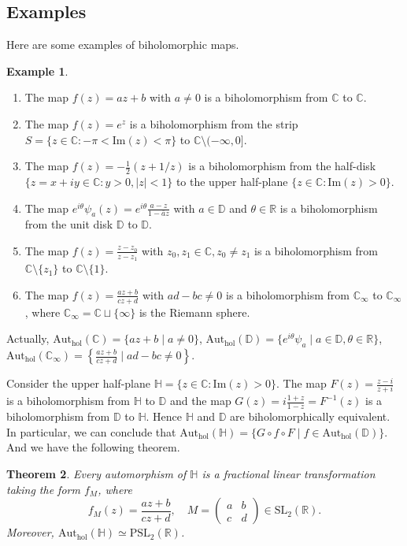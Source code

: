 \documentclass{article}
\newtheorem{theorem}{Theorem}[section]
\theoremstyle{definition}
\newtheorem{example}[theorem]{Example}
\newcommand{\R}{\mathbb{R}}
\newcommand{\C}{\mathbb{C}}
\newcommand{\im}{\mathrm{Im}}
\newcommand{\auth}{\mathrm{Aut}_{\mathrm{hol}}}
\begin{document}
\subsection{Examples}
Here are some examples of biholomorphic maps.
\begin{example}
    \begin{enumerate}
        \item The map \(f(z)=az+b\) with \(a\neq 0\) is a biholomorphism from \(\C\) to \(\C\).
        \item The map \(f(z)=e^{z}\) is a biholomorphism from the strip \(S=\{z\in\C\colon -\pi<\im(z)<\pi\}\) to \(\C\setminus(-\infty,0]\).
        \item The map \(f(z)=-\frac{1}{2}\left(z+1/z\right)\) is a biholomorphism from the half-disk \(\{z=x+iy\in\C\colon y>0, |z|<1\}\) to the upper half-plane $\{z\in\C\colon \im(z)>0\}$.
        \item The map \(e^{i\theta}\psi_a(z) = e^{i\theta}\frac{a-z}{1-\bar{a}z}\) with \(a\in\mathbb{D}\) and \(\theta \in \R\) is a biholomorphism from the unit disk \(\mathbb{D}\) to \(\mathbb{D}\).
        \item The map \(f(z)=\frac{z-z_0}{z-z_1}\) with \(z_0,z_1\in\C, z_0\neq z_1\) is a biholomorphism from \(\C\setminus\{z_1\}\) to \(\C\setminus\{1\}\).
        \item The map \(f(z)=\frac{az+b}{cz+d}\) with \(ad-bc\neq 0\) is a biholomorphism from \(\C_{\infty}\) to \(\C_{\infty}\), where \(\C_{\infty}=\C\sqcup\{\infty\}\) is the Riemann sphere.
    \end{enumerate}
\end{example}
Actually, $\auth(\C)=\{az+b \mid a\neq 0\}$, $\auth(\mathbb{D})=\{e^{i\theta}\psi_a \mid a\in\mathbb{D}, \theta \in \R\}$, $\auth(\C_{\infty})=\left\{\frac{az+b}{cz+d} \mid ad-bc\neq 0\right\}$. 

Consider the upper half-plane \(\mathbb{H}=\{z\in\C\colon \im(z)>0\}\). The map \(F(z)=\frac{z-i}{z+i}\) is a biholomorphism from \(\mathbb{H}\) to \(\mathbb{D}\) and the map \(G(z)=i\frac{1+z}{1-z}=F^{-1}(z)\) is a biholomorphism from \(\mathbb{D}\) to \(\mathbb{H}\). Hence \(\mathbb{H}\) and \(\mathbb{D}\) are biholomorphically equivalent.
In particular, we can conclude that \(\auth(\mathbb{H})=\{G\circ f \circ F \mid f\in \auth(\mathbb{D})\}\). And we have the following theorem.
\begin{theorem}
    Every automorphism of $\mathbb{H}$ is a fractional linear transformation taking the form $f_M$, where
    \begin{equation*}
        f_M(z) = \frac{az+b}{cz+d}, \quad M=\begin{pmatrix}
            a & b\\
            c & d
        \end{pmatrix} \in \mathrm{SL}_2(\R).
    \end{equation*}
    Moreover, $\auth(\mathbb{H})\simeq \mathrm{PSL}_2(\R)$.
\end{theorem}
\end{document}
